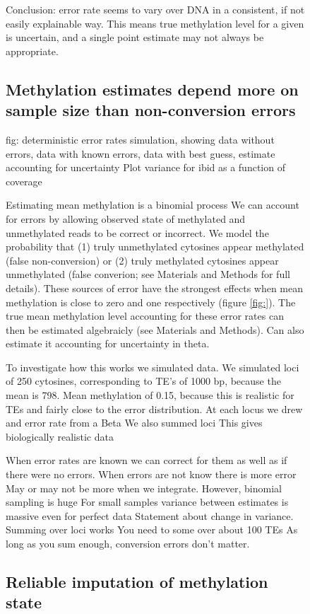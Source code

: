 \documentclass[12pt,longbibliography]{article}
\begin{document}
\begin{figure}
Conclusion: error rate seems to vary over DNA in a consistent, if not easily explainable way.
This means true methylation level for a given is uncertain, and a single point estimate may not always be appropriate.

\subsection{Methylation estimates depend more on sample size than non-conversion errors}

fig:
    deterministic error rates
    simulation, showing data without errors, data with known errors, data with best guess, estimate accounting for uncertainty
    Plot variance for ibid as a function of coverage


Estimating mean methylation is a binomial process
We can account for errors by allowing observed state of methylated and unmethylated reads to be correct or incorrect.
We model the probability that (1) truly unmethylated cytosines appear methylated (false non-conversion) or (2) truly methylated cytosines appear unmethylated (false converion; see Materials and Methods for full details).
These sources of error have the strongest effects when mean methylation is close to zero and one respectively (figure \ref{fig:}).
The true mean methylation level accounting for these error rates can then be estimated algebraicly (see Materials and Methods).
Can also estimate it accounting for uncertainty in theta.

To investigate how this works we simulated data.
We simulated loci of 250 cytosines, corresponding to TE's of 1000 bp, because the mean is 798.
Mean methylation of 0.15, because this is realistic for TEs and fairly close to the error distribution.
At each locus we drew and error rate from a Beta
We also summed loci
This gives biologically realistic data

When error rates are known we can correct for them as well as if there were no errors.
When errors are not know there is more error
May or may not be more when we integrate.
However, binomial sampling is huge
For small samples variance between estimates is massive even for perfect data
Statement about change in variance.
Summing over loci works
You need to some over about 100 TEs
As long as you sum enough, conversion errors don't matter.

\subsection{Reliable imputation of methylation state}


\end{figure}
\end{document}
